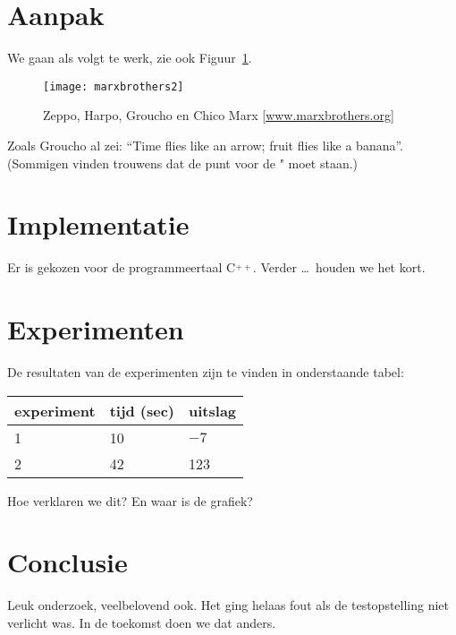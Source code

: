 \documentclass[10pt]{article}
\begin{document}
{\section{Aanpak}

We gaan als volgt te werk, zie ook Figuur~\ref{marx}.

\bigskip

\begin{figure}[!htbp]
\begin{center}
\texttt{[image: marxbrothers2]}
\end{center}
\caption{Zeppo, Harpo, Groucho en Chico Marx [\href{http://www.marx-brothers.org}{\underline{www.marxbrothers.org}}]}\label{marx}
\end{figure}

\noindent
Zoals Groucho al zei:
``Time flies like an arrow; fruit flies like a banana''. (Sommigen vinden trouwens dat de punt voor de " moet staan.)

\section{Implementatie}

Er is gekozen voor de programmeertaal C$\stackrel{++}{}$.
Verder \ldots\ houden we het kort.

\section{Experimenten}

De resultaten van de experimenten zijn te
vinden in onderstaande tabel:

\begin{center}
\begin{tabular}{l|l|l}
experiment & tijd (sec) & uitslag\\
\hline
1 & 10 & $-7$\\
2 & 42 & 123
\end{tabular}
\end{center}
Hoe verklaren we dit? En waar is de grafiek?

\section{Conclusie}

Leuk onderzoek, veelbelovend ook. Het ging helaas
fout als de testopstelling niet verlicht was.
In de toekomst doen we dat anders.

\begin{thebibliography}{XX}


\end{thebibliography}}
\end{document}
